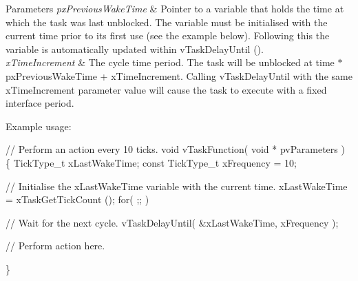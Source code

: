 \begin{DoxyParams}{Parameters}
{\em px\+Previous\+Wake\+Time} & Pointer to a variable that holds the time at which the task was last unblocked. The variable must be initialised with the current time prior to its first use (see the example below). Following this the variable is automatically updated within v\+Task\+Delay\+Until ().\\
\hline
{\em x\+Time\+Increment} & The cycle time period. The task will be unblocked at time $\ast$px\+Previous\+Wake\+Time + x\+Time\+Increment. Calling v\+Task\+Delay\+Until with the same x\+Time\+Increment parameter value will cause the task to execute with a fixed interface period.\\
\hline
\end{DoxyParams}
Example usage\+: 
\begin{DoxyPre}
// Perform an action every 10 ticks.
void vTaskFunction( void * pvParameters )
\{
TickType\_t xLastWakeTime;
const TickType\_t xFrequency = 10;
\begin{DoxyVerb}// Initialise the xLastWakeTime variable with the current time.
xLastWakeTime = xTaskGetTickCount ();
for( ;; )
{
 // Wait for the next cycle.
 vTaskDelayUntil( &xLastWakeTime, xFrequency );

 // Perform action here.
}
\end{DoxyVerb}

\}
  \end{DoxyPre}
 